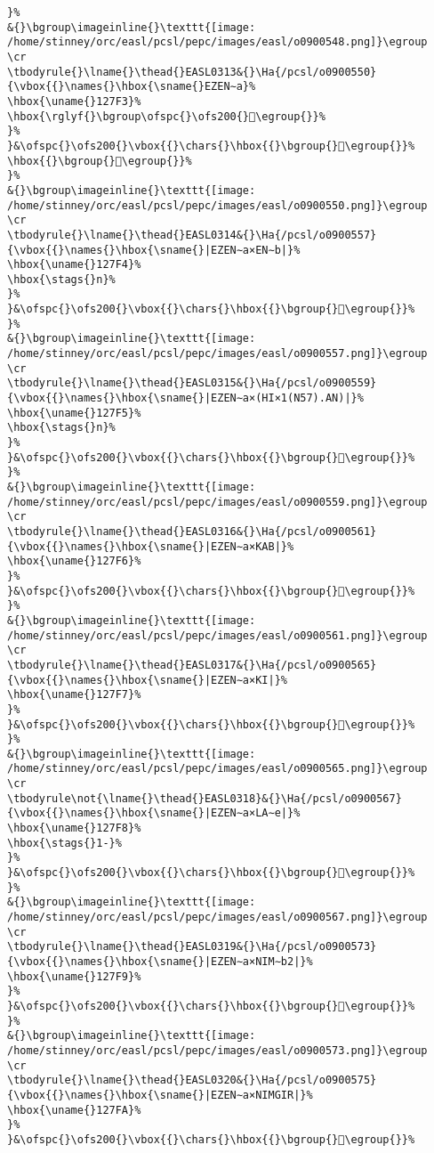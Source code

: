 \begin{verbatim}
}%
&{}\bgroup\imageinline{}\texttt{[image: /home/stinney/orc/easl/pcsl/pepc/images/easl/o0900548.png]}\egroup
\cr
\tbodyrule{}\lname{}\thead{}EASL0313&{}\Ha{/pcsl/o0900550}{\vbox{{}\names{}\hbox{\sname{}EZEN∼a}%
\hbox{\uname{}127F3}%
\hbox{\rglyf{}\bgroup\ofspc{}\ofs200{}𒟳\egroup{}}%
}%
}&\ofspc{}\ofs200{}\vbox{{}\chars{}\hbox{{}\bgroup{}𒠁\egroup{}}%
\hbox{{}\bgroup{}𒟳\egroup{}}%
}%
&{}\bgroup\imageinline{}\texttt{[image: /home/stinney/orc/easl/pcsl/pepc/images/easl/o0900550.png]}\egroup
\cr
\tbodyrule{}\lname{}\thead{}EASL0314&{}\Ha{/pcsl/o0900557}{\vbox{{}\names{}\hbox{\sname{}|EZEN∼a×EN∼b|}%
\hbox{\uname{}127F4}%
\hbox{\stags{}n}%
}%
}&\ofspc{}\ofs200{}\vbox{{}\chars{}\hbox{{}\bgroup{}𒟴\egroup{}}%
}%
&{}\bgroup\imageinline{}\texttt{[image: /home/stinney/orc/easl/pcsl/pepc/images/easl/o0900557.png]}\egroup
\cr
\tbodyrule{}\lname{}\thead{}EASL0315&{}\Ha{/pcsl/o0900559}{\vbox{{}\names{}\hbox{\sname{}|EZEN∼a×(HI×1(N57).AN)|}%
\hbox{\uname{}127F5}%
\hbox{\stags{}n}%
}%
}&\ofspc{}\ofs200{}\vbox{{}\chars{}\hbox{{}\bgroup{}𒟵\egroup{}}%
}%
&{}\bgroup\imageinline{}\texttt{[image: /home/stinney/orc/easl/pcsl/pepc/images/easl/o0900559.png]}\egroup
\cr
\tbodyrule{}\lname{}\thead{}EASL0316&{}\Ha{/pcsl/o0900561}{\vbox{{}\names{}\hbox{\sname{}|EZEN∼a×KAB|}%
\hbox{\uname{}127F6}%
}%
}&\ofspc{}\ofs200{}\vbox{{}\chars{}\hbox{{}\bgroup{}𒟶\egroup{}}%
}%
&{}\bgroup\imageinline{}\texttt{[image: /home/stinney/orc/easl/pcsl/pepc/images/easl/o0900561.png]}\egroup
\cr
\tbodyrule{}\lname{}\thead{}EASL0317&{}\Ha{/pcsl/o0900565}{\vbox{{}\names{}\hbox{\sname{}|EZEN∼a×KI|}%
\hbox{\uname{}127F7}%
}%
}&\ofspc{}\ofs200{}\vbox{{}\chars{}\hbox{{}\bgroup{}𒟷\egroup{}}%
}%
&{}\bgroup\imageinline{}\texttt{[image: /home/stinney/orc/easl/pcsl/pepc/images/easl/o0900565.png]}\egroup
\cr
\tbodyrule\not{\lname{}\thead{}EASL0318}&{}\Ha{/pcsl/o0900567}{\vbox{{}\names{}\hbox{\sname{}|EZEN∼a×LA∼e|}%
\hbox{\uname{}127F8}%
\hbox{\stags{}1-}%
}%
}&\ofspc{}\ofs200{}\vbox{{}\chars{}\hbox{{}\bgroup{}𒟸\egroup{}}%
}%
&{}\bgroup\imageinline{}\texttt{[image: /home/stinney/orc/easl/pcsl/pepc/images/easl/o0900567.png]}\egroup
\cr
\tbodyrule{}\lname{}\thead{}EASL0319&{}\Ha{/pcsl/o0900573}{\vbox{{}\names{}\hbox{\sname{}|EZEN∼a×NIM∼b2|}%
\hbox{\uname{}127F9}%
}%
}&\ofspc{}\ofs200{}\vbox{{}\chars{}\hbox{{}\bgroup{}𒟹\egroup{}}%
}%
&{}\bgroup\imageinline{}\texttt{[image: /home/stinney/orc/easl/pcsl/pepc/images/easl/o0900573.png]}\egroup
\cr
\tbodyrule{}\lname{}\thead{}EASL0320&{}\Ha{/pcsl/o0900575}{\vbox{{}\names{}\hbox{\sname{}|EZEN∼a×NIMGIR|}%
\hbox{\uname{}127FA}%
}%
}&\ofspc{}\ofs200{}\vbox{{}\chars{}\hbox{{}\bgroup{}𒟺\egroup{}}%

\end{verbatim}
